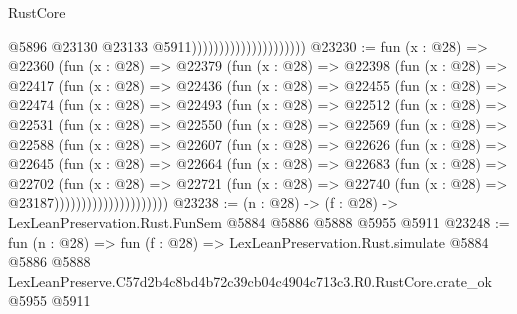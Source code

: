 \begin{lexlean}{RustCore}
\begin{coremodule}
                                              @5896
                                              @23130
                                              @23133
                                              @5911)))))))))))))))))))))
@23230 := fun (x : @28) =>
  @22360
    (fun (x : @28) =>
    @22379
      (fun (x : @28) =>
      @22398
        (fun (x : @28) =>
        @22417
          (fun (x : @28) =>
          @22436
            (fun (x : @28) =>
            @22455
              (fun (x : @28) =>
              @22474
                (fun (x : @28) =>
                @22493
                  (fun (x : @28) =>
                  @22512
                    (fun (x : @28) =>
                    @22531
                      (fun (x : @28) =>
                      @22550
                        (fun (x : @28) =>
                        @22569
                          (fun (x : @28) =>
                          @22588
                            (fun (x : @28) =>
                            @22607
                              (fun (x : @28) =>
                              @22626
                                (fun (x : @28) =>
                                @22645
                                  (fun (x : @28) =>
                                  @22664
                                    (fun (x : @28) =>
                                    @22683
                                      (fun (x : @28) =>
                                      @22702
                                        (fun (x : @28) =>
                                        @22721
                                          (fun (x : @28) =>
                                          @22740 (fun (x : @28) => @23187)))))))))))))))))))))
@23238 := (n : @28) -> (f : @28) -> LexLeanPreservation.Rust.FunSem @5884 @5886 @5888 @5955 @5911
@23248 := fun (n : @28) =>
  fun (f : @28) =>
  LexLeanPreservation.Rust.simulate
    @5884
    @5886
    @5888
    LexLeanPreserve.C57d2b4c8bd4b72c39cb04c4904c713c3.R0.RustCore.crate_ok
    @5955
    @5911
\end{coremodule}
\end{lexlean}
